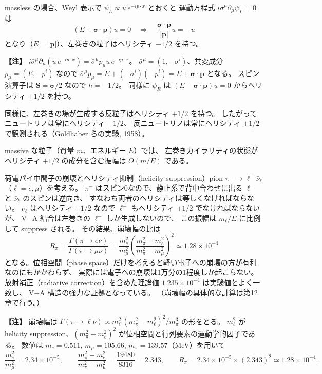 \documentclass[uplatex,dvipdfmx,a4paper,11pt,openany]{jsbook}
\newcommand{\en}[1]{（#1）}
\newenvironment{note}{\vspace{1ex}\par\footnotesize\noindent\textbf{【注】}}{\par\vspace{1ex}}
\numberwithin{equation}{chapter}
\theoremstyle{definition}
\theoremstyle{plain}
\theoremstyle{remark}
\begin{document}
massless の場合、Weyl 表示で $\psi_L\propto u\,e^{-ip\cdot x}$ とおくと
運動方程式 $i\bar\sigma^\mu\partial_\mu\psi_L=0$ は
\begin{equation}
(E+\bm\sigma\cdot\bm p)u=0
\quad\Longrightarrow\quad
\frac{\bm\sigma\cdot\bm p}{|\bm p|}u=-u
\end{equation}
となり（$E=|\bm p|$）、左巻きの粒子はヘリシティ $-1/2$ を持つ。
\begin{note}
$i\bar\sigma^\mu\partial_\mu(u\,e^{-ip\cdot x})=\bar\sigma^\mu p_\mu u\,e^{-ip\cdot x}$。
$\bar\sigma^\mu=(1,-\sigma^i)$、共変成分 $p_\mu=(E,-p^i)$ なので
$\bar\sigma^\mu p_\mu=E+(-\sigma^i)(-p^i)=E+\bm\sigma\cdot\bm p$ となる。
スピン演算子は $\bm S=\bm\sigma/2$ なので $h=-1/2$。
同様に $\psi_R$ は $(E-\bm\sigma\cdot\bm p)u=0$ からヘリシティ $+1/2$ を持つ。
\end{note}
同様に、左巻きの場が生成する反粒子はヘリシティ $+1/2$ を持つ。
したがってニュートリノは常にヘリシティ $-1/2$、
反ニュートリノは常にヘリシティ $+1/2$ で観測される（Goldhaber らの実験, 1958）。

massive な粒子（質量 $m$、エネルギー $E$）では、
左巻きカイラリティの状態がヘリシティ $+1/2$ の成分を含む振幅は
$O(m/E)$ である。
\begin{myex}{荷電パイ中間子の崩壊とヘリシティ抑制（helicity suppression）}{pion}
$\pi^-\to\ell^-\bar\nu_\ell$（$\ell=e,\mu$）を考える。
$\pi^-$ はスピン0なので、静止系で背中合わせに出る
$\ell^-$ と $\bar\nu_\ell$ のスピンは逆向き、
すなわち両者のヘリシティは等しくなければならない。
$\bar\nu_\ell$ はヘリシティ $+1/2$ なので $\ell^-$ もヘリシティ $+1/2$ でなければならないが、
V$-$A 結合は左巻きの $\ell^-$ しか生成しないので、
この振幅は $m_\ell/E$ に比例して suppress される。
その結果、崩壊幅の比は
\begin{equation}
R_\pi=\frac{\Gamma(\pi\to e\bar\nu)}{\Gamma(\pi\to\mu\bar\nu)}
=\frac{m_e^2}{m_\mu^2}
\left(\frac{m_\pi^2-m_e^2}{m_\pi^2-m_\mu^2}\right)^2
\simeq1.28\times10^{-4}
\end{equation}
となる。位相空間\en{phase space}だけを考えると軽い電子への崩壊の方が有利なのにもかかわらず、
実際には電子への崩壊は1万分の1程度しか起こらない。
放射補正\en{radiative correction}を含めた理論値 $1.235\times10^{-4}$ は実験値とよく一致し、
V$-$A 構造の強力な証拠となっている。
（崩壊幅の具体的な計算は第12章で行う。）
\end{myex}
\begin{note}
崩壊幅は $\Gamma(\pi\to\ell\bar\nu)\propto m_\ell^2\,(m_\pi^2-m_\ell^2)^2/m_\pi^3$ の形をとる。
$m_\ell^2$ が helicity suppression、$(m_\pi^2-m_\ell^2)^2$ が位相空間と行列要素の運動学的因子である。
数値は $m_e=0.511$, $m_\mu=105.66$, $m_\pi=139.57$（MeV）を用いて
\[
\frac{m_e^2}{m_\mu^2}=2.34\times10^{-5},
\qquad
\frac{m_\pi^2-m_e^2}{m_\pi^2-m_\mu^2}=\frac{19480}{8316}=2.343,
\qquad
R_\pi=2.34\times10^{-5}\times(2.343)^2\simeq1.28\times10^{-4}.
\]
\end{note}
\end{document}
